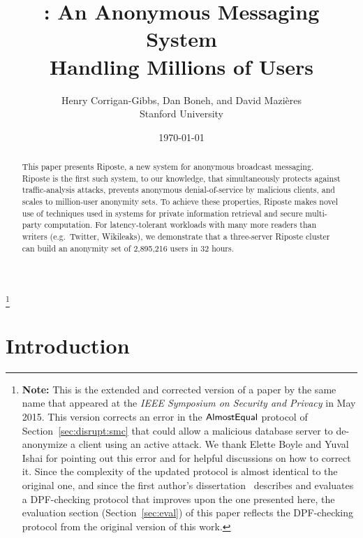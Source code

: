 \documentclass[10pt,twocolumn]{article}
\title{\Large \bf \Name: An Anonymous Messaging System\\Handling Millions of Users}
\author{Henry Corrigan-Gibbs, Dan Boneh, and David Mazi\`eres\\
Stanford University}
\date{\today}
\newcommand\blfootnote[1]{\begingroup
  \renewcommand\thefootnote{}\footnote{#1}\addtocounter{footnote}{-1}\endgroup
}
\newcommand{\name}{Riposte\xspace}
\newcommand{\Name}{Riposte\xspace}
\begin{document}
\maketitle

\begin{abstract}
This paper presents \name, a new system for anonymous
broadcast messaging.
\Name is the first such system, to our knowledge, that
simultaneously protects against traffic-analysis attacks,
prevents anonymous denial-of-service by malicious clients,
and scales to million-user anonymity sets.
To achieve these properties, \name makes novel use
of techniques used in systems for private information retrieval and
secure multi-party computation. 
For latency-tolerant workloads with many more readers than writers 
(e.g.~Twitter, Wikileaks), we demonstrate that
a three-server \name cluster can build an anonymity set of 2,895,216 users
in 32 hours.
\end{abstract}

\blfootnote{{\color{blue} \textbf{Note:}} 
This is the extended and corrected
version of a paper by the same name that appeared at the
{\em IEEE Symposium on Security and Privacy}
in May 2015. This version corrects an error in the 
${\sf AlmostEqual}$ protocol of Section~\ref{sec:disrupt:smc}
that could allow a malicious database server to de-anonymize
a client using an active attack.
We thank Elette Boyle and Yuval Ishai for pointing out this
error and for helpful discussions on how to correct it.
Since the complexity of the updated protocol is almost identical
to the original one, and since the first author's 
dissertation~\cite{thesis} describes and evaluates
a DPF-checking protocol that improves upon the one
presented here, the evaluation section (Section~\ref{sec:eval}) 
of this paper reflects the DPF-checking protocol from
the original version of this work.
}

 
\section{Introduction}
\end{document}
